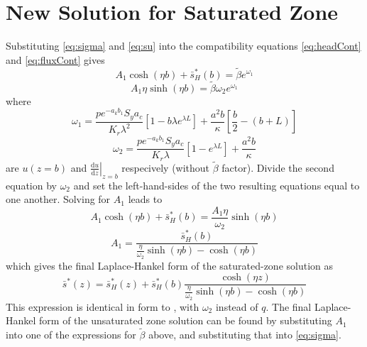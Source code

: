\documentclass[11pt]{article}
\begin{document}
\section{New Solution for Saturated Zone}
Substituting \eqref{eq:sigma} and \eqref{eq:su} into the compatibility
equations \eqref{eq:headCont} and \eqref{eq:fluxCont} gives
$$  A_1 \cosh(\eta b) + \bar{s}_H^{\ast}(b) = \tilde{\beta}e^{\omega_1}$$
$$ A_1 \eta  \sinh(\eta b)  = \tilde{\beta} \omega_2 e^{\omega_1}$$
where 
$$ \omega_1 = \frac{p e^{-a_k b_1} S_y a_c} {K_r \lambda^2} \left[ 1  - b\lambda e^{\lambda L} \right] + \frac{a^2 b}{\kappa}\left[\frac{b}{2} - \left( b+L\right) \right]$$
\begin{equation}
  \label{eq:omega2}
  \omega_2 = \frac{p e^{-a_k b_1} S_y a_c} {K_r \lambda}\left[ 1 - e^{\lambda L} \right] + \frac{a^2 b}{\kappa}
\end{equation}
are $u(z=b)$ and $\left. \frac{\mathrm{d} u}{\mathrm{d}z} \right|_{z=b}$
respecively (without $\tilde\beta$ factor).
Divide the second equation by $\omega_2$ and set the left-hand-sides of the two resulting equations equal to one another.  Solving for $A_1$ leads to
$$A_1 \cosh(\eta b) + \bar{s}_H^{\ast}(b) = \frac{A_1  \eta}{\omega_2}  \sinh(\eta b) $$
$$ A_1 = \frac{\bar{s}_H^{\ast}(b)}{\frac{\eta}{\omega_2}  \sinh(\eta b) - \cosh(\eta b)}$$
which gives the final Laplace-Hankel form of the saturated-zone solution as
$$ \bar{s}^{\ast}(z)  = \bar{s}_H^{\ast}(z) + \bar{s}_H^{\ast}(b) \frac{\cosh(\eta z)}{\frac{\eta}{\omega_2}  \sinh(\eta b) - \cosh(\eta b)}$$ 
This expression is identical in form to \cite[eqn.\ C17]{mishra10},
with $\omega_2$ instead of $q$.  The final Laplace-Hankel form of the unsaturated zone solution can be found by substituting $A_1$ into one of the expressions for $\tilde\beta$ above, and substituting that into \eqref{eq:sigma}.


\end{document}
